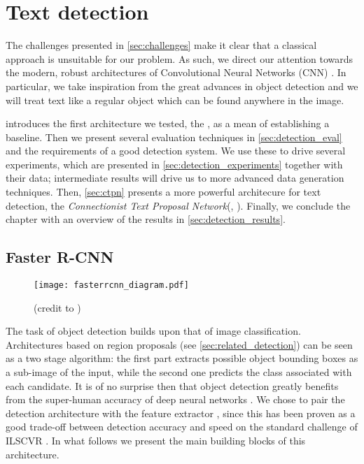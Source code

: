 
\chapter{Text detection}
\label{ch:detection}

The challenges presented in \autoref{sec:challenges} make it clear that a classical approach is unsuitable for our problem. As such, we direct our attention towards the modern, robust architectures of Convolutional Neural Networks (CNN) \citep{leCun_CNN}. In particular, we take inspiration from the great advances in object detection and we will treat text like a regular object which can be found anywhere in the image.

 introduces the first architecture we tested, the \FRCNN{} \citep{faster_rcnn}, as a mean of establishing a baseline. Then we present several evaluation techniques in \autoref{sec:detection_eval} and the requirements of a good detection system. We use these to drive several experiments, which are presented in \autoref{sec:detection_experiments} together with their data; intermediate results will drive us to more advanced data generation techniques. Then, \autoref{sec:ctpn} presents a more powerful architecure for text detection, the \emph{Connectionist Text Proposal Network}(\CTPN{}, \citet{ctpn}). Finally, we conclude the chapter with an overview of the results in \autoref{sec:detection_results}.


\section{Faster R-CNN}\label{sec:faster_rcnn}

	\begin{figure}
		\texttt{[image: fasterrcnn\_diagram.pdf]}
		\caption[The \FRCNN{} architecture]{(credit to \cite{detection_benchmark}) \label{fig:faster_rcnn}}
	\end{figure}

	The task of object detection builds upon that of image classification. Architectures based on region proposals (see \autoref{sec:related_detection}) can be seen as a two stage algorithm: the first part extracts possible object bounding boxes as a sub-image of the input, while the second one predicts the class associated with each candidate. It is of no surprise then that object detection greatly benefits from the super-human accuracy of deep neural networks \citep{superhuman_classif}. We chose to pair the \FRCNN{} detection architecture with the \RESNET{} feature extractor \citep{resnet}, since this has been proven as a good trade-off between detection accuracy and speed on the standard challenge of ILSCVR \citep{detection_benchmark}. In what follows we present the main building blocks of this architecture.

